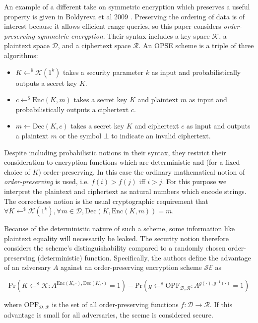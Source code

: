 \documentclass[11pt, pdftex]{article}
\begin{document}
An example of a different take on symmetric encryption which preserves a useful property is given in Boldyreva et al 2009 \cite{opse}. Preserving the ordering of data is of interest because it allows efficient range queries, so this paper considers {\em order-preserving symmetric encryption}. Their syntax includes a key space $\mathcal{K}$, a plaintext space $\mathcal{D}$, and a ciphertext space $\mathcal{R}$. An OPSE scheme is a triple of three algorithms:

\begin{itemize}
	\item $K \gets^\$ \mathcal{K}(1^k)$ takes a security parameter $k$ as input and probabilistically outputs a secret key $K$.
	\item $c \gets^\$ \mathrm{Enc}(K,m)$ takes a secret key $K$ and plaintext $m$ as input and probabilistically outputs a ciphertext $c$.
	\item $m \gets \mathrm{Dec}(K,c)$ takes a secret key $K$ and ciphertext $c$ as input and outputs a plaintext $m$ or the symbol $\bot$ to indicate an invalid ciphertext.
\end{itemize}

Despite including probabilistic notions in their syntax, they restrict their consideration to encryption functions which are deterministic and (for a fixed choice of $K$) order-preserving. In this case the ordinary mathematical notion of {\em order-preserving} is used, i.e. $f(i) > f(j)$ iff $i > j$. For this purpose we interpret the plaintext and ciphertext as natural numbers which encode strings. The correctness notion is the usual cryptographic requirement that $\forall K \gets^\$ \mathcal{K}(1^k), \forall m \in \mathcal{D}, \mathrm{Dec}(K,\mathrm{Enc}(K,m)) = m$.

Because of the deterministic nature of such a scheme, some information like plaintext equality will necessarily be leaked. The security notion therefore considers the scheme's distinguishability compared to a randomly chosen order-preserving (deterministic) function. Specifically, the authors define the advantage of an adversary $A$ against an order-preserving encryption scheme $\mathcal{SE}$ as

$$\mathrm{Pr}(K \gets^\$ \mathcal{K} : A^{\mathrm{Enc}(K,\cdot),\mathrm{Dec}(K,\cdot)} = 1) - \mathrm{Pr}(g \gets^\$ \mathrm{OPF}_{\mathcal{D},\mathcal{R}} : A^{g(\cdot),g^{-1}(\cdot)} = 1)$$

\noindent where $\mathrm{OPF}_{\mathcal{D},\mathcal{R}}$ is the set of all order-preserving functions $f: \mathcal{D} \to \mathcal{R}$. If this advantage is small for all adversaries, the sceme is considered secure.
\end{document}
